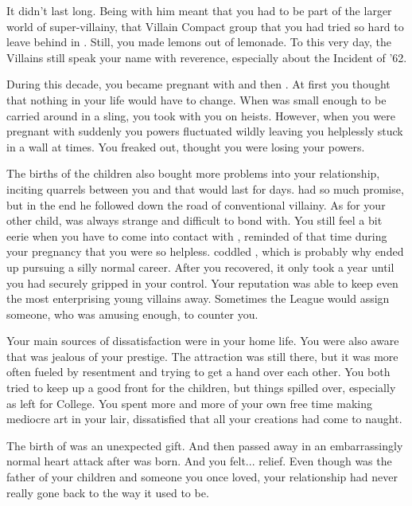 \documentclass[char]{LRSguildcamp1}
\begin{document}
It didn't last long. Being with him meant that you had to be part of the larger world of super-villainy, that Villain Compact group that you had tried so hard to leave behind in \pSuperSchool{}. Still, you made lemons out of lemonade. To this very day, the Villains still speak your name with reverence, especially about the Incident of '62. 

During this decade, you became pregnant with \cOldest{} and then \cArchitect{}. At first you thought that nothing in your life would have to change. When \cOldest{} was small enough to be carried around in a sling, you took \cOldest{\them} with you on heists. However, when you were pregnant with \cArchitect{} suddenly you powers fluctuated wildly leaving you helplessly stuck in a wall at times. You freaked out, thought you were losing your powers. 

The births of the children also bought more problems into your relationship, inciting quarrels between you and \cGS{\intro} that would last for days. \cOldest{} had so much promise, but in the end he followed \cGS{\intro} down the road of conventional villainy. As for your other child, \cArchitect{} was always strange and difficult to bond with. You still feel a bit eerie when you have to come into contact with \cArchitect{} , reminded of that time during your pregnancy that you were so helpless. \cGS{} coddled \cArchitect{\them}, which is probably why \cArchitect{\they} ended up pursuing a silly normal career. 
After you recovered,  it only took a year until you had securely gripped \pCityGrandma{} in your control. Your reputation was able to keep even the most enterprising young villains away. Sometimes the League would assign someone, who was amusing enough, to counter you. 

Your main sources of dissatisfaction were in your home life. You were also aware that \cGS{\intro} was jealous of your prestige. The attraction was still there, but it was more often fueled by resentment and trying to get a hand over each other.  You both tried to keep up a good front for the children, but things spilled over, especially as \cOldest{} left for College. You spent more and more of your own free time making mediocre art in your lair, dissatisfied that all your creations had come to naught. 

The birth of \cYoungest{} was an unexpected gift. And then \cGS{\intro} passed away in an embarrassingly normal heart attack after \cYoungest{} was born. And you felt... relief. Even though \cGS{\intro} was the father of your children and someone you once loved, your relationship had never really gone back to the way it used to be.  
\end{document}
